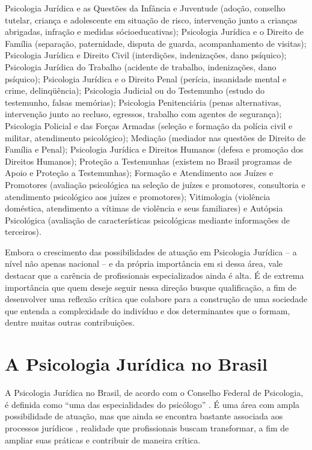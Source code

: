 \begin{citacao}
	Psicologia Jurídica e as Questões da Infância e Juventude (adoção, conselho tutelar, criança e adolescente em situação de risco, intervenção junto a crianças abrigadas, infração e medidas sócioeducativas); Psicologia Jurídica e o Direito de Família (separação, paternidade, disputa de guarda, acompanhamento de visitas); Psicologia Jurídica e Direito Civil (interdições, indenizações, dano psíquico); Psicologia Jurídica do Trabalho (acidente de trabalho, indenizações, dano psíquico); Psicologia Jurídica e o Direito Penal (perícia, insanidade mental e crime, delinqüência); Psicologia Judicial ou do Testemunho (estudo do testemunho, falsas memórias); Psicologia Penitenciária (penas alternativas, intervenção junto ao recluso, egressos, trabalho com agentes de segurança); Psicologia Policial e das Forças Armadas (seleção e formação da polícia civil e militar, atendimento psicológico); Mediação (mediador nas questões de Direito de Família e Penal); Psicologia Jurídica e Direitos Humanos (defesa e promoção dos Direitos Humanos); Proteção a Testemunhas (existem no Brasil programas de Apoio e Proteção a Testemunhas); Formação e Atendimento aos Juízes e Promotores (avaliação psicológica na seleção de juízes e promotores, consultoria e atendimento psicológico aos juízes e promotores); Vitimologia (violência doméstica, atendimento a vítimas de violência e seus familiares) e Autópsia Psicológica (avaliação de características psicológicas mediante informações de terceiros).
\end{citacao}

Embora o crescimento das possibilidades de atuação em Psicologia Jurídica -- a nível não apenas nacional -- e da própria importância em si dessa área, vale destacar que a carência de profissionais especializados ainda é alta. É de extrema importância que quem deseje seguir nessa direção busque qualificação, a fim de desenvolver uma reflexão crítica que colabore para a construção de uma sociedade que entenda a complexidade do indivíduo e dos determinantes que o formam, dentre muitas outras contribuições.

\section{A Psicologia Jurídica no Brasil}

A Psicologia Jurídica no Brasil, de acordo com o Conselho Federal de Psicologia, é definida como ``uma das especialidades do psicólogo'' \cite[p. 234]{COSTA2009}. É uma área com ampla possibilidade de atuação, mas que ainda se encontra bastante associada aos processos jurídicos , realidade que profissionais buscam transformar, a fim de ampliar suas práticas e contribuir de maneira crítica.

